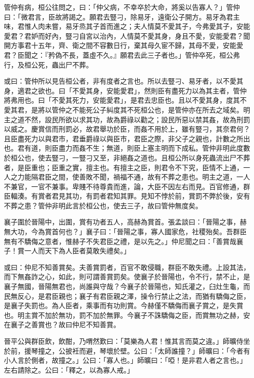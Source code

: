 \begin{pinyinscope}
管仲有病，桓公往問之，曰：「仲父病，不幸卒於大命，將奚以告寡人？」管仲曰：「微君言，臣故將謁之。願君去豎刁，除易牙，遠衛公子開方。易牙為君主味，君惟人肉未嘗，易牙烝其子首而進之；夫人情莫不愛其子，今弗愛其子，安能愛君？君妒而好內，豎刁自宮以治內，人情莫不愛其身，身且不愛，安能愛君？聞開方事君十五年，齊、衛之間不容數日行，棄其母久宦不歸，其母不愛，安能愛君？臣聞之：『矜偽不長，蓋虛不久。』願君去此三子者也。」管仲卒死，桓公弗行，及桓公死，蟲出尸不葬。

或曰：管仲所以見告桓公者，非有度者之言也。所以去豎刁、易牙者，以不愛其身，適君之欲也。曰「不愛其身，安能愛君」，然則臣有盡死力以為其主者，管仲將弗用也。曰「不愛其死力，安能愛君」，是君去忠臣也。且以不愛其身，度其不愛其君，是將以管仲之不能死公子糾度其不死桓公也，是管仲亦在所去之域矣。明主之道不然，設民所欲以求其功，故為爵祿以勸之；設民所惡以禁其姦，故為刑罰以威之。慶賞信而刑罰必，故君舉功於臣，而姦不用於上，雖有豎刁，其奈君何？且臣盡死力以與君市，君垂爵祿以與臣市，君臣之際，非父子之親也，計數之所出也。君有道，則臣盡力而姦不生；無道，則臣上塞主明而下成私。管仲非明此度數於桓公也，使去豎刁，一豎刁又至，非絕姦之道也。且桓公所以身死蟲流出尸不葬者，是臣重也；臣重之實，擅主也。有擅主之臣，則君令不下究，臣情不上通，一人之力能隔君臣之間，使善敗不聞，禍福不通，故有不葬之患也。明主之道，一人不兼官，一官不兼事。卑賤不待尊貴而進，論，大臣不因左右而見。百官修通，群臣輻湊。有賞者君見其功，有罰者君知其罪。見知不悖於前，賞罰不弊於後，安有不葬之患？管仲非明此言於桓公也，使去三子，故曰管仲無度矣。

襄子圍於晉陽中，出圍，賞有功者五人，高赫為賞首。張孟談曰：「晉陽之事，赫無大功，今為賞首何也？」襄子曰：「晉陽之事，寡人國家危，社稷殆矣。吾群臣無有不驕侮之意者，惟赫子不失君臣之禮，是以先之。」仲尼聞之曰：「善賞哉襄子！賞一人而天下為人臣者莫敢失禮矣。」

或曰：仲尼不知善賞矣。夫善賞罰者，百官不敢侵職，群臣不敢失禮。上設其法，而下無姦詐之心，如此，則可謂善賞罰矣。使襄子於晉陽也，令不行，禁不止，是襄子無國，晉陽無君也，尚誰與守哉？今襄子於晉陽也，知氏灌之，臼灶生龜，而民無反心，是君臣親也；襄子有君臣親之澤，操令行禁止之法，而猶有驕侮之臣，是襄子失罰也。為人臣者，乘事而有功則賞。今赫僅不驕侮而襄子賞之，是失賞也。明主賞不加於無功，罰不加於無罪。今襄子不誅驕侮之臣，而賞無功之赫，安在襄子之善賞也？故曰仲尼不知善賞。

晉平公與群臣飲，飲酣，乃喟然歎曰：「莫樂為人君！惟其言而莫之違。」師曠侍坐於前，援琴撞之，公披衽而避，琴壞於壁。公曰：「太師誰撞？」師曠曰：「今者有小人言於側者，故撞之。」公曰：「寡人也。」師曠曰：「啞！是非君人者之言也。」左右請除之。公曰：「釋之，以為寡人戒。」


\end{pinyinscope}
